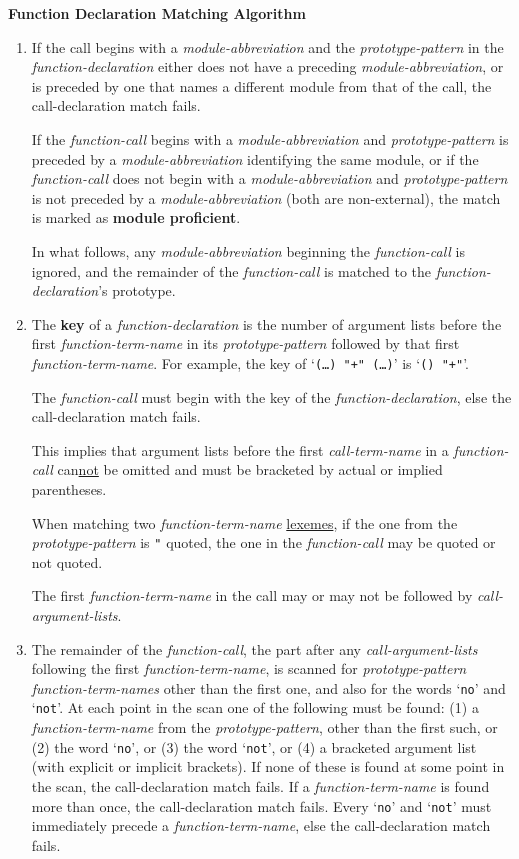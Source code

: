 \documentclass[12pt]{article}
\newcommand{\key}[1]{{\rm \bfseries #1}}
\begin{document}
\centerline{\bf Function Declaration Matching Algorithm}
\begin{enumerate}
\item\label{FUNCTION-DECLARATION-MODULE-ABBREVIATION}
If the call begins with a {\em module-abbreviation}
and the {\em prototype-pattern} in the {\em function-declaration}
either does not have a preceding {\em module-abbreviation},
or is preceded by one that names a different module from that of the call,
the call-declaration match fails.

If the {\em function-call} begins with a {\em module-abbreviation}
and {\em prototype-pattern} is preceded by a {\em module-abbreviation}
identifying the same module, or
if the {\em function-call} does not begin with a {\em module-abbreviation}
and {\em prototype-pattern} is not preceded by a {\em module-abbreviation}
(both are non-external),
the match is marked as \key{module proficient}\label{MODULE-PROFICIENT}.

In what follows, any {\em module-abbreviation} beginning the
{\em function-call} is ignored, and the remainder of the {\em function-call}
is matched to the {\em function-declaration}'s prototype.

\item\label{CALL-DECLARATION-KEY}
The \key{key} of a {\em function-declaration}
is the number of argument lists before
the first {\em function-term-name} in its {\em prototype-pattern}
followed by that first
{\em function-term-name}.  For example, the key of
`{\tt (\ldots) "+" (\ldots)}' is `{\tt () "+"}'.

The {\em function-call} must begin with the key of the
{\em function-declaration}, else the call-declaration match fails.

This implies that argument lists before the first {\em call-term-name}
in a {\em function-call} can\underline{not} be omitted and must be bracketed
by actual or implied parentheses.

When matching two {\em function-term-name} \underline{lexemes}, if the one from
the {\em prototype-pattern} is {\tt "} quoted, the
one in the {\em function-call} may be quoted or not quoted.

The first {\em function-term-name} in the call may or may not be followed by
{\em call-argument-lists}.


\item\label{CALL-DECLARATION-TERM-NAMES}
The remainder of the {\em function-call}, the part after any
{\em call-argument-lists} following the first {\em function-term-name},
is scanned for {\em prototype-pattern}
{\em function-term-names} other than the first one, and also for
the words `{\tt no}' and `{\tt not}'.  At each point in the scan
one of the following must be found: (1) a {\em function-term-name} from
the {\em prototype-pattern}, other than the first such, or
(2) the word `{\tt no}', or (3) the word `{\tt not}', or
(4) a bracketed argument list (with explicit or
implicit brackets).
If none of these is found at some point in the scan,
the call-declaration match fails.  If a {\em function-term-name} is
found more than once, the call-declaration match fails.
Every `{\tt no}' and `{\tt not}' must immediately precede a
{\em function-term-name}, else the call-declaration match fails.


\end{enumerate}
\end{document}
